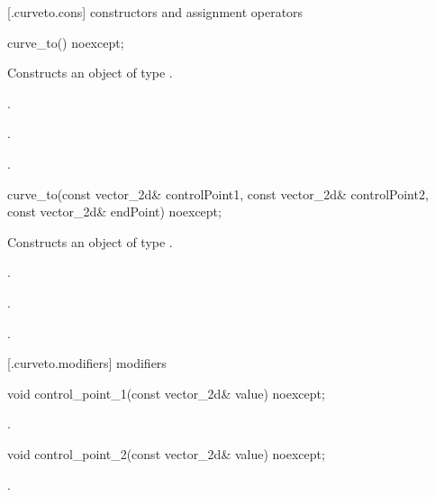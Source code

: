  [\iotwod.curveto.cons] { constructors and assignment operators}

\begin{itemdecl}
    curve_to() noexcept;
\end{itemdecl}
\begin{itemdescr}
	\pnum
	\effects
	Constructs an object of type .
	
	\pnum
	\postconditions
	.

	.

	.

\end{itemdescr}

\begin{itemdecl}
    curve_to(const vector_2d& controlPoint1, const vector_2d& controlPoint2,
      const vector_2d& endPoint) noexcept;
\end{itemdecl}
\begin{itemdescr}
	\pnum
	\effects
	Constructs an object of type .
	
	\pnum
	\postconditions
	.

	.

	.

\end{itemdescr}

 [\iotwod.curveto.modifiers]{ modifiers}

\begin{itemdecl}
    void control_point_1(const vector_2d& value) noexcept;
\end{itemdecl}
\begin{itemdescr}
	\pnum
	\postconditions
	.
	
\end{itemdescr}

\begin{itemdecl}
    void control_point_2(const vector_2d& value) noexcept;
\end{itemdecl}
\begin{itemdescr}
	\pnum
	\postconditions
	.
	
\end{itemdescr}

